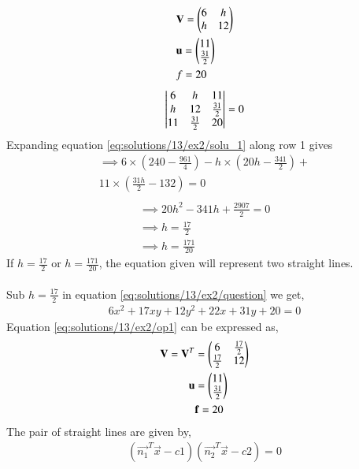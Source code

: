 \begin{align}
    &\mathbf{V}=\begin{pmatrix}6 & h \\ h & 12\end{pmatrix} \label{eq:solutions/13/ex2/eq1}\\ 
    &\mathbf{u}=\begin{pmatrix}11 \\ \frac{31}{2}\end{pmatrix}  \label{eq:solutions/13/ex2/eq2}\\
    & f=20 \label{eq:solutions/13/ex2/eq3}
\end{align}
\begin{align}
    \begin{vmatrix}6 & h & 11\\h & 12 & \frac{31}{2}\\11&\frac{31}{2} & 20\end{vmatrix} = 0 \label{eq:solutions/13/ex2/solu_1}
\end{align}
Expanding equation \eqref{eq:solutions/13/ex2/solu_1} along row 1 gives
\begin{multline*}
\implies 6\times(240 - \frac{961}{4}) -h\times(20h - \frac{341}{2}) +\\ 11\times(\frac{31h}{2}-132) = 0\\
\end{multline*}
\begin{align}
\implies 20h^{2}-341h+\frac{2907}{2} = 0\\
\implies \boxed{h=\frac{17}{2}} \label{eq:solutions/13/ex2/result1}\\
\implies \boxed{h=\frac{171}{20}} \label{eq:solutions/13/ex2/result2}
\end{align}
If $h=\frac{17}{2}$ or $h=\frac{171}{20}$, the equation given will represent two straight lines.\\
\\
Sub $h=\frac{17}{2}$ in equation \eqref{eq:solutions/13/ex2/question} we get,
\begin{align}
6x^2+17xy+12y^2+22x+31y+20=0 \label{eq:solutions/13/ex2/op1}
\end{align}
Equation \eqref{eq:solutions/13/ex2/op1} can be expressed as,
\begin{align}
\mathbf{V}=\mathbf{V}^T&=\begin{pmatrix}6 & \frac{17}{2} \\ \frac{17}{2} & 12\end{pmatrix} \label{eq:solutions/13/ex2/eq1vec}\\
\mathbf{u}&=\begin{pmatrix}11 \\ \frac{31}{2}\end{pmatrix} \label{eq:solutions/13/ex2/eq2vec}\\
&\mathbf{f}=20
\end{align}
The pair of straight lines are given by,
\begin{align}
    (\vec{n_1}^{T}\vec{x} - c1)(\vec{n_2}^{T}\vec{x} - c2)=0\label{eq:solutions/13/ex2/maineq1}
\end{align}
